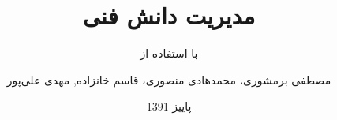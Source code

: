 \documentclass{../boostan/Boostan-Book}
\title{مدیریت دانش فنی}
\subtitle{با استفاده از \lr{Doxygen}}
\author{
	مصطفی برمشوری،
	محمدهادی منصوری،
	قاسم خانزاده,
	مهدی علی‌پور
}
\date{پاییز 1391}
\begin{document}
\maketitle
\tableofcontents
\listoffigures






%   


%



\makeglossaries
\printglossaries
\end{document}
